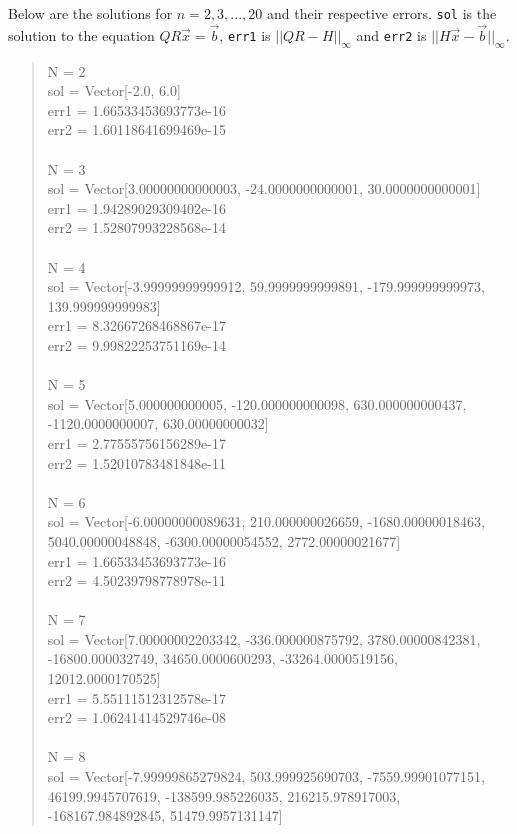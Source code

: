 \documentclass[letterpaper,12pt]{article}
\begin{document}
Below are the solutions for $n = 2,3,...,20$ and their respective errors.
\texttt{sol} is the solution to the equation $QR\vec{x}=\vec{b}$, \texttt{err1}
is $||QR - H||_{\infty}$ and \texttt{err2} is $||H\vec{x} - \vec{b}||_{\infty}$.
\\
\begin{quote}
N = 2
\\sol = Vector[-2.0, 6.0]
\\err1 = 1.66533453693773e-16
\\err2 = 1.60118641699469e-15
\\
\\N = 3
\\sol = Vector[3.00000000000003, -24.0000000000001, 30.0000000000001]
\\err1 = 1.94289029309402e-16
\\err2 = 1.52807993228568e-14
\\
\\N = 4
\\sol = Vector[-3.99999999999912, 59.9999999999891, -179.999999999973, 139.999999999983]
\\err1 = 8.32667268468867e-17
\\err2 = 9.99822253751169e-14
\\
\\N = 5
\\sol = Vector[5.000000000005, -120.000000000098, 630.000000000437, -1120.0000000007, 630.00000000032]
\\err1 = 2.77555756156289e-17
\\err2 = 1.52010783481848e-11
\\
\\N = 6
\\sol = Vector[-6.00000000089631, 210.000000026659, -1680.00000018463, 5040.00000048848, -6300.00000054552, 2772.00000021677]
\\err1 = 1.66533453693773e-16
\\err2 = 4.50239798778978e-11
\\
\\N = 7
\\sol = Vector[7.00000002203342, -336.000000875792, 3780.00000842381, -16800.000032749, 34650.0000600293, -33264.0000519156, 12012.0000170525]
\\err1 = 5.55111512312578e-17
\\err2 = 1.06241414529746e-08
\\
\\N = 8
\\sol = Vector[-7.99999865279824, 503.999925690703, -7559.99901077151, 46199.9945707619, -138599.985226035, 216215.978917003, -168167.984892845, 51479.9957131147]

\end{quote}
\end{document}
